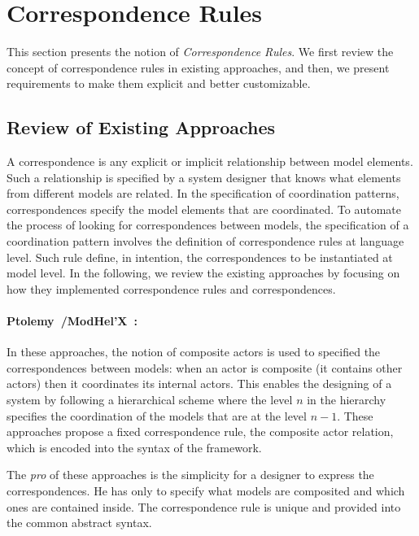 \section{Correspondence Rules}
This section presents the notion of \emph{Correspondence Rules}. We first review the concept of correspondence rules in existing approaches, and then, we present requirements to make them explicit and better customizable.  

\subsection{Review of Existing Approaches}
A correspondence is any explicit or implicit relationship between model elements. Such a relationship is specified by a system designer that knows what elements from different models are related. In the specification of coordination patterns, correspondences specify the model elements that are coordinated. To automate the process of looking for correspondences between models, the specification of a coordination pattern involves the definition of correspondence rules at language level. Such rule define, in intention, the correspondences to be instantiated at model level. In the following, we review the existing approaches by focusing on how they implemented correspondence rules and correspondences.       

\paragraph{Ptolemy~\cite{ptoleframebib}/ModHel'X~\cite{modhelxbib}:}
In these approaches, the notion of composite actors is used to specified the correspondences between models: when an actor is composite (\ie it contains other actors) then it coordinates its internal actors. This enables the designing of a system by following a hierarchical scheme where the level $n$ in the hierarchy specifies the coordination of the models that are at the level $n-1$. These approaches propose a fixed correspondence rule, \ie the composite actor relation, which is encoded into the syntax of the framework.

The \emph{pro} of these approaches is the simplicity for a designer to express the correspondences. He has only to specify what models are composited and which ones are contained inside. The correspondence rule is unique and provided into the common abstract syntax. 

